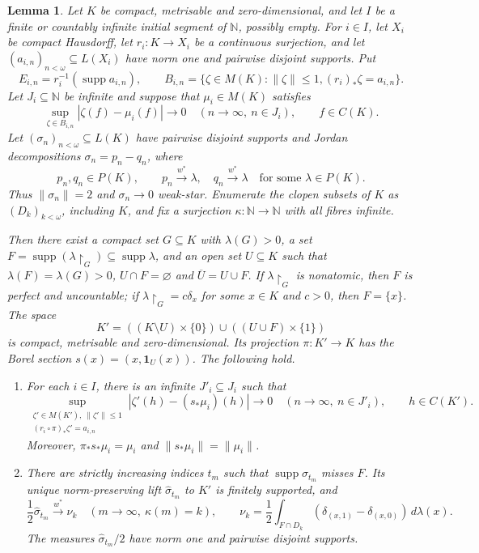 \documentclass[a4paper,11pt]{amsart}
\theoremstyle{plain}
\newtheorem{lemma}[theorem]{Lemma}
\theoremstyle{definition}
\theoremstyle{remark}
\newcommand{\N}{\mathbb N}
\newcommand{\supp}{\operatorname{supp}}
\newcommand{\one}{\mathbf 1}
\newcommand{\restr}[1]{{\restriction_{#1}}}
\numberwithin{equation}{section}
\begin{document}
\begin{lemma}\label{lem:simultaneous-successor}
Let $K$ be compact, metrisable and zero-dimensional, and let $I$ be a
finite or countably infinite initial segment of $\N$, possibly empty.
For $i\in I$, let $X_i$ be compact Hausdorff, let $r_i:K\to X_i$ be a
continuous surjection, and let $(a_{i,n})_{n<\omega}\subseteq L(X_i)$
have norm one and pairwise disjoint supports. Put
\[
 E_{i,n}=r_i^{-1}(\supp a_{i,n}),\qquad
 B_{i,n}=\{\zeta\in M(K):\|\zeta\|\leqslant1,
                 (r_i)_*\zeta=a_{i,n}\}.
\]
Let $J_i\subseteq\N$ be infinite and suppose that $\mu_i\in M(K)$ satisfies
\begin{equation}\label{eq:old-uniform-hypothesis}
 \sup_{\zeta\in B_{i,n}}|\zeta(f)-\mu_i(f)|\longrightarrow0
 \quad(n\to\infty,\ n\in J_i),\qquad f\in C(K).
\end{equation}
Let $(\sigma_n)_{n<\omega}\subseteq L(K)$ have pairwise disjoint supports
and Jordan decompositions $\sigma_n=p_n-q_n$, where
\[
 p_n,q_n\in P(K),\qquad
 p_n\xrightarrow{w^*}\lambda,\quad q_n\xrightarrow{w^*}\lambda
 \quad\text{for some }\lambda\in P(K).
\]
Thus $\|\sigma_n\|=2$ and $\sigma_n\to0$ weak-star.
Enumerate the clopen subsets of $K$ as $(D_k)_{k<\omega}$, including $K$,
and fix a surjection $\kappa:\N\to\N$ with all fibres infinite.

Then there exist a compact set
$G\subseteq K$ with $\lambda(G)>0$, a set
$F=\supp(\lambda\restr{G})\subseteq\supp\lambda$, and an open set
$U\subseteq K$ such that $\lambda(F)=\lambda(G)>0$,
$U\cap F=\varnothing$ and $\overline U=U\cup F$.
If $\lambda\restr{G}$ is nonatomic, then $F$ is perfect and uncountable;
if $\lambda\restr{G}=c\delta_x$ for some $x\in K$ and $c>0$, then
$F=\{x\}$.
The space
\[
 K'=((K\setminus U)\times\{0\})\cup((U\cup F)\times\{1\})
\]
is compact, metrisable and zero-dimensional. Its projection $\pi:K'\to K$
has the Borel section $s(x)=(x,\one_U(x))$. The following hold.
\begin{enumerate}
\item For each $i\in I$, there is an infinite $J'_i\subseteq J_i$ such that
\begin{equation}\label{eq:successor-old-conclusion}
 \sup_{\substack{\zeta'\in M(K'),\ \|\zeta'\|\leqslant1\\
                  (r_i\circ\pi)_*\zeta'=a_{i,n}}}
 |\zeta'(h)-(s_*\mu_i)(h)|\longrightarrow0
 \quad(n\to\infty,\ n\in J'_i),\qquad h\in C(K').
\end{equation}
Moreover, $\pi_*s_*\mu_i=\mu_i$ and $\|s_*\mu_i\|=\|\mu_i\|$.
\item There are strictly increasing indices $t_m$ such that
$\supp\sigma_{t_m}$ misses $F$. Its unique norm-preserving lift
$\widehat\sigma_{t_m}$ to $K'$ is finitely supported, and
\begin{equation}\label{eq:fresh-localised-limit}
 \frac12\widehat\sigma_{t_m}\xrightarrow{w^*}\nu_k
 \quad(m\to\infty,\ \kappa(m)=k),\qquad
 \nu_k=\frac12\int_{F\cap D_k}
       (\delta_{(x,1)}-\delta_{(x,0)})\,d\lambda(x).
\end{equation}
The measures $\widehat\sigma_{t_m}/2$ have norm one and pairwise disjoint
supports.
\end{enumerate}
\end{lemma}
\end{document}
